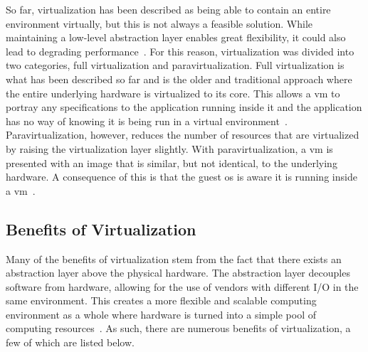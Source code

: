 \documentclass{kththesis}
\begin{document}
So far, virtualization has been described as being able to contain an entire environment virtually, but this is not always a feasible solution. While maintaining a low-level abstraction layer enables great flexibility, it could also lead to degrading performance\ \cite{virtualization-basics}. For this reason, virtualization was divided into two categories, full virtualization and paravirtualization. Full virtualization is what has been described so far and is the older and traditional approach where the entire underlying hardware is virtualized to its core. This allows a \Gls{vm} to portray any specifications to the application running inside it and the application has no way of knowing it is being run in a virtual environment\ \cite{virtualization-basics, xen-virtualization, hypervisor-xen}. Paravirtualization, however, reduces the number of resources that are virtualized by raising the virtualization layer slightly. With paravirtualization, a \Gls{vm} is presented with an image that is similar, but not identical, to the underlying hardware. A consequence of this is that the guest \Gls{os} is aware it is running inside a \Gls{vm}\ \cite{xen-virtualization, hypervisor-xen}.

\subsection*{Benefits of Virtualization}
Many of the benefits of virtualization stem from the fact that there exists an abstraction layer above the physical hardware. The abstraction layer decouples software from hardware, allowing for the use of vendors with different I/O in the same environment. This creates a more flexible and scalable computing environment as a whole where hardware is turned into a simple pool of computing resources\ \cite{virtualization-trends}. As such, there are numerous benefits of virtualization, a few of which are listed below.
\end{document}
